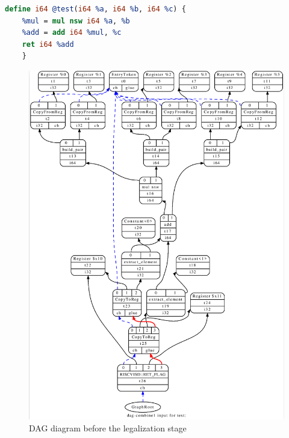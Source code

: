 \begin{lstlisting}[caption={Intermediate Representation code input for legalization example}, label={lst:ir_legalization}, language=llvm, style=nasm]
  define i64 @test(i64 %a, i64 %b, i64 %c) {
    %mul = mul nsw i64 %a, %b
    %add = add i64 %mul, %c
    ret i64 %add
    }
  \end{lstlisting}

\begin{figure}
  \centering
  \includegraphics[scale=0.5]{the_llvm_compiler/dag_before_legalization.png}
  \caption{DAG diagram before the legalization stage}
  \label{fig:dag_before_legalization}
\end{figure}

